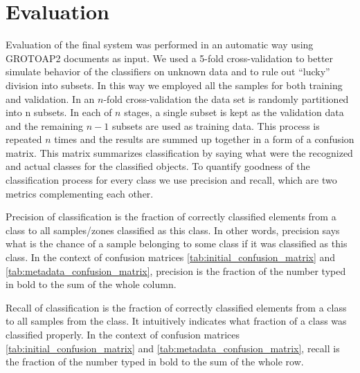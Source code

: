 \chapter{Evaluation}\label{chapter:evaluation}
Evaluation of the final system was performed in an automatic way using GROTOAP2 documents as input. We used a 5-fold cross-validation to better simulate behavior of the classifiers on unknown data and to rule out ``lucky'' division into subsets. In this way we employed all the samples for both training and validation. In an $n$-fold cross-validation the data set is randomly partitioned into n subsets. In each of $n$ stages, a single subset is kept as the validation data and the remaining $n-1$ subsets are used as training data. This process is repeated $n$ times and the results are summed up together in a form of a confusion matrix. This matrix summarizes classification by saying what were the recognized and actual classes for the classified objects.
To quantify goodness of the classification process for every class we use precision and recall, which are two metrics complementing each other.

Precision of classification is the fraction of correctly classified elements from a class to all samples/zones classified as this class. In other words, precision says what is the chance of a sample belonging to some class if it was classified as this class. In the context of confusion matrices \ref{tab:initial_confusion_matrix} and \ref{tab:metadata_confusion_matrix}, precision is the fraction of the number typed in bold to the sum of the whole column.

Recall of classification is the fraction of correctly classified elements from a class to all samples from the class. It intuitively indicates what fraction of a class was classified properly. In the context of confusion matrices \ref{tab:initial_confusion_matrix} and \ref{tab:metadata_confusion_matrix}, recall is the fraction of the number typed in bold to the sum of the whole row.


